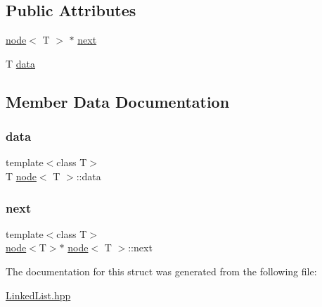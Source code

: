 \subsection*{Public Attributes}
\begin{DoxyCompactItemize}
\item 
\mbox{\hyperlink{structnode}{node}}$<$ T $>$ $\ast$ \mbox{\hyperlink{structnode_ac96190e012822e6c053d2a5e9eedd68d}{next}}
\item 
T \mbox{\hyperlink{structnode_a0a3e961e5caf1562f0c27caef3940e7a}{data}}
\end{DoxyCompactItemize}


\subsection{Member Data Documentation}
\mbox{\label{structnode_a0a3e961e5caf1562f0c27caef3940e7a}} 
\subsubsection{\texorpdfstring{data}{data}}
{\footnotesize\ttfamily template$<$class T$>$ \\
T \mbox{\hyperlink{structnode}{node}}$<$ T $>$\+::data}

\mbox{\label{structnode_ac96190e012822e6c053d2a5e9eedd68d}} 
\subsubsection{\texorpdfstring{next}{next}}
{\footnotesize\ttfamily template$<$class T$>$ \\
\mbox{\hyperlink{structnode}{node}}$<$T$>$$\ast$ \mbox{\hyperlink{structnode}{node}}$<$ T $>$\+::next}



The documentation for this struct was generated from the following file\+:\begin{DoxyCompactItemize}
\item 
\mbox{\hyperlink{_linked_list_8hpp}{Linked\+List.\+hpp}}\end{DoxyCompactItemize}
